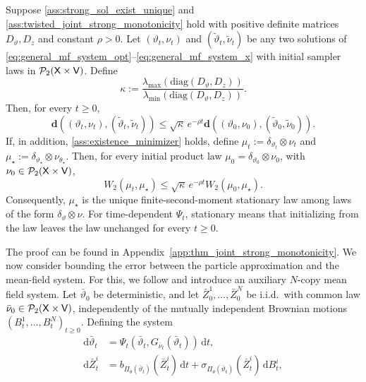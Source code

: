 \begin{theorem}\label{thm:twisted_joint_strong_monotonicity}
Suppose \ref{ass:strong_sol_exist_unique} and \ref{ass:twisted_joint_strong_monotonicity} hold with positive definite matrices \(D_\vartheta,D_z\) and constant \(\rho>0\). Let \((\vartheta_t,\nu_t)\) and \((\tilde\vartheta_t,\tilde\nu_t)\) be any two solutions of \eqref{eq:general_mf_system_opt}--\eqref{eq:general_mf_system_x} with initial sampler laws in \(\mathcal P_2({\mathsf{X}}\times{\mathsf{V}})\). Define
\[
\kappa
:=
\frac{\lambda_{\max}(\mathrm{diag}(D_\vartheta,D_z))}
{\lambda_{\min}(\mathrm{diag}(D_\vartheta,D_z))}.
\]
Then, for every \(t\ge0\),
\begin{equation*}
\mathbf d((\vartheta_t,\nu_t),(\tilde\vartheta_t,\tilde\nu_t))
\le
\sqrt{\kappa}\,e^{-\rho t}
\mathbf d((\vartheta_0,\nu_0),(\tilde\vartheta_0,\tilde\nu_0)). 
\end{equation*}
If, in addition, \ref{ass:existence_minimizer} holds, define
\(\mu_t:=\delta_{\vartheta_t}\otimes\nu_t\) and
\(\mu_\star:=\delta_{\vartheta_\star}\otimes\nu_{\theta_\star}\).
Then, for every initial product law
\(\mu_0=\delta_{\vartheta_0}\otimes\nu_0\), with
\(\nu_0\in\mathcal P_2({\mathsf{X}}\times{\mathsf{V}})\),
\[
W_2(\mu_t,\mu_\star)
\le
\sqrt{\kappa}\,e^{-\rho t}W_2(\mu_0,\mu_\star).
\]
Consequently, \(\mu_\star\) is the unique finite-second-moment stationary law among laws of the form \(\delta_\vartheta\otimes\nu\). For time-dependent \(\Psi_t\), stationary means that initializing from the law leaves the law unchanged for every \(t\ge0\).
\end{theorem}
The proof can be found in Appendix~\ref{app:thm_joint_strong_monotonicity}. We now consider bounding the error between the particle approximation and the mean-field system. For this, we follow \citet{pgd_theory} and introduce an auxiliary $N$-copy mean field system. Let \(\bar\vartheta_0\) be deterministic, and let
\(\bar Z_0^1,\ldots,\bar Z_0^N\) be i.i.d.\ with common law
\(\bar\nu_0\in\mathcal P_2({\mathsf{X}}\times{\mathsf{V}})\), independently of the mutually independent Brownian motions $(B_t^1,\ldots,B_t^N)_{t\ge0}$. Defining the system
\begin{align}
    \mathrm d\bar\vartheta_t
    &=
    \Psi_t(\bar\vartheta_t,G_{\bar\nu_t}(\bar\vartheta_t))\,\mathrm dt,\qquad\qquad\qquad \label{eq:n-copy-1}\\
    \mathrm d\bar Z_t^i
    &=
    b_{\Pi_\theta(\bar\vartheta_t)}(\bar Z_t^i)\,\mathrm dt
    +
    \sigma_{\Pi_\theta(\bar\vartheta_t)}(\bar Z_t^i)\,\mathrm dB_t^i,
    \label{eq:n-copy-2}
\end{align}
